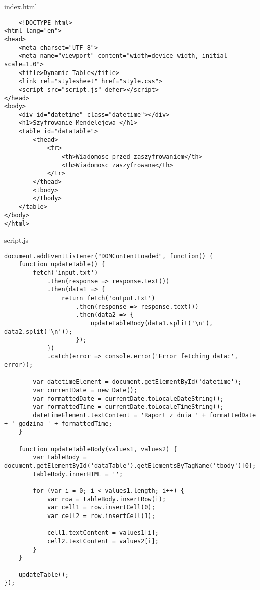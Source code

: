 \documentclass[12pt,a4paper]{article}
\begin{document}
\noindent\hrulefill
\newpage
index.html
\begin{lstlisting}
    <!DOCTYPE html>
<html lang="en">
<head>
    <meta charset="UTF-8">
    <meta name="viewport" content="width=device-width, initial-scale=1.0">
    <title>Dynamic Table</title>
    <link rel="stylesheet" href="style.css">
    <script src="script.js" defer></script>
</head>
<body>
    <div id="datetime" class="datetime"></div>
    <h1>Szyfrowanie Mendelejewa </h1>
    <table id="dataTable">
        <thead>
            <tr>
                <th>Wiadomosc przed zaszyfrowaniem</th>
                <th>Wiadomosc zaszyfrowana</th>
            </tr>
        </thead>
        <tbody>
        </tbody>
    </table>
</body>
</html>
\end{lstlisting}
\newpage

script.js
\begin{lstlisting}[style=JavaScript, label=JabaScript]
document.addEventListener("DOMContentLoaded", function() {
    function updateTable() {
        fetch('input.txt')
            .then(response => response.text())
            .then(data1 => {
                return fetch('output.txt')
                    .then(response => response.text())
                    .then(data2 => {
                        updateTableBody(data1.split('\n'), data2.split('\n'));
                    });
            })
            .catch(error => console.error('Error fetching data:', error));

        var datetimeElement = document.getElementById('datetime');
        var currentDate = new Date();
        var formattedDate = currentDate.toLocaleDateString();
        var formattedTime = currentDate.toLocaleTimeString();
        datetimeElement.textContent = 'Raport z dnia ' + formattedDate + ' godzina ' + formattedTime;
    }

    function updateTableBody(values1, values2) {
        var tableBody = document.getElementById('dataTable').getElementsByTagName('tbody')[0];
        tableBody.innerHTML = '';

        for (var i = 0; i < values1.length; i++) {
            var row = tableBody.insertRow(i);
            var cell1 = row.insertCell(0);
            var cell2 = row.insertCell(1);

            cell1.textContent = values1[i];
            cell2.textContent = values2[i];
        }
    }

    updateTable();
});
\end{lstlisting}
\noindent\hrulefill
\newpage
\end{document}
